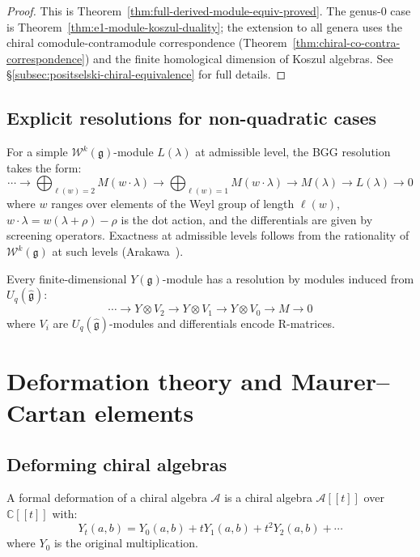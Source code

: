 \begin{proof}
This is Theorem~\ref{thm:full-derived-module-equiv-proved}.
The genus-$0$ case is Theorem~\ref{thm:e1-module-koszul-duality};
the extension to all genera uses the chiral comodule-contramodule
correspondence (Theorem~\ref{thm:chiral-co-contra-correspondence})
and the finite homological dimension of Koszul algebras.
See \S\ref{subsec:positselski-chiral-equivalence} for full details.
\end{proof}

\subsection{Explicit resolutions for non-quadratic cases}

\begin{example}
For a simple $\mathcal{W}^k(\mathfrak{g})$-module $L(\lambda)$ at admissible level,
the BGG resolution takes the form:
\[
\cdots \to \bigoplus_{\ell(w)=2} M(w \cdot \lambda) \to \bigoplus_{\ell(w)=1} M(w \cdot \lambda) \to M(\lambda) \to L(\lambda) \to 0
\]
where $w$ ranges over elements of the Weyl group of length $\ell(w)$, $w \cdot \lambda = w(\lambda + \rho) - \rho$ is the dot action, and the differentials are given by screening operators.  Exactness at admissible levels follows from the rationality of $\mathcal{W}^k(\mathfrak{g})$ at such levels (Arakawa~\cite{Arakawa17}).
\end{example}

\begin{example}
Every finite-dimensional $Y(\mathfrak{g})$-module has a resolution by modules induced from $U_q(\hat{\mathfrak{g}})$:
\[
\cdots \to Y \otimes V_2 \to Y \otimes V_1 \to Y \otimes V_0 \to M \to 0
\]
where $V_i$ are $U_q(\hat{\mathfrak{g}})$-modules and differentials encode R-matrices.
\end{example}


\section{Deformation theory and Maurer--Cartan elements}

\subsection{Deforming chiral algebras}

\begin{definition}
A formal deformation of a chiral algebra $\mathcal{A}$ is a chiral algebra $\mathcal{A}[[t]]$ over $\mathbb{C}[[t]]$ with:
\[
Y_t(a,b) = Y_0(a,b) + t Y_1(a,b) + t^2 Y_2(a,b) + \cdots
\]
where $Y_0$ is the original multiplication.
\end{definition}

